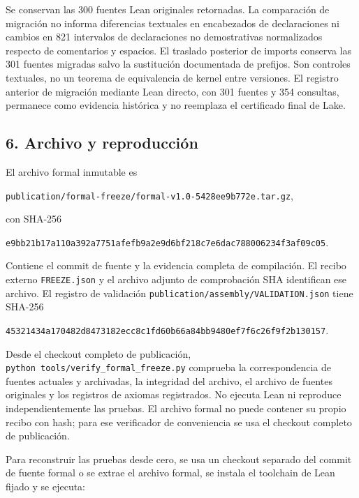 \documentclass[spanish,11pt,a4paper]{article}
\begin{document}
Se conservan las 300 fuentes Lean originales retornadas. La comparación de migración no informa diferencias textuales en encabezados de declaraciones ni cambios en 821 intervalos de declaraciones no demostrativas normalizados respecto de comentarios y espacios. El traslado posterior de imports conserva las 301 fuentes migradas salvo la sustitución documentada de prefijos. Son controles textuales, no un teorema de equivalencia de kernel entre versiones. El registro anterior de migración mediante Lean directo, con 301 fuentes y 354 consultas, permanece como evidencia histórica y no reemplaza el certificado final de Lake.

\subsection{6. Archivo y reproducción}\label{archivo-y-reproducciuxf3n}

El archivo formal inmutable es

\texttt{publication/\allowbreak{}formal-freeze/\allowbreak{}formal-v1.\allowbreak{}0-5428ee9b772e.\allowbreak{}tar.\allowbreak{}gz},

con SHA-256

\texttt{e9bb21b1\allowbreak{}7a110a39\allowbreak{}2a7751af\allowbreak{}efb9a2e9\allowbreak{}d6bf218c\allowbreak{}7e6dac78\allowbreak{}8006234f\allowbreak{}3af09c05}.

Contiene el commit de fuente y la evidencia completa de compilación. El recibo externo \texttt{FREEZE.\allowbreak{}json} y el archivo adjunto de comprobación SHA identifican ese archivo. El registro de validación \texttt{publication/\allowbreak{}assembly/\allowbreak{}VALIDATION.\allowbreak{}json} tiene SHA-256

\texttt{45321434\allowbreak{}a170482d\allowbreak{}8473182e\allowbreak{}cc8c1fd6\allowbreak{}0b66a84b\allowbreak{}b9480ef7\allowbreak{}f6c26f9f\allowbreak{}2b130157}.

Desde el checkout completo de publicación, \texttt{python\ tools/\allowbreak{}verify\_\allowbreak{}formal\_\allowbreak{}freeze.\allowbreak{}py} comprueba la correspondencia de fuentes actuales y archivadas, la integridad del archivo, el archivo de fuentes originales y los registros de axiomas registrados. No ejecuta Lean ni reproduce independientemente las pruebas. El archivo formal no puede contener su propio recibo con hash; para ese verificador de conveniencia se usa el checkout completo de publicación.

Para reconstruir las pruebas desde cero, se usa un checkout separado del commit de fuente formal o se extrae el archivo formal, se instala el toolchain de Lean fijado y se ejecuta:
\end{document}
